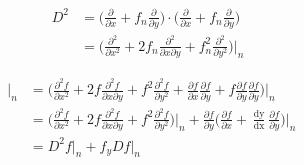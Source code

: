 \documentclass[12 pt]{article}
\begin{document}
	
	{
		\large
		\begin{equation}
			\begin{split}
				D^{2} &= \bigg(\frac{\partial }{\partial x} + f_{n}\frac{\partial }{\partial y}\bigg)\cdot \bigg(\frac{\partial }{\partial x} + f_{n}\frac{\partial }{\partial y}\bigg)\\
				&= \Big(\frac{\partial^{2}}{\partial x^{2}} + 2f_{n}\frac{\partial^{2}}{\partial x \partial y} + f_{n}^{2}\frac{\partial^{2}}{\partial y^{2}}\Big)\Big\vert_{n}
			\end{split}
		\end{equation}
	}
	
	{
		\large
		\begin{equation*}
			\begin{split}
				\frac{\mathop{\mathrm{d^{2}f}}}{\mathop{\mathrm{dx^{2}}}}\Big\vert_{n} &= \Big(\frac{\partial^{2}f}{\partial x^{2}} + 2f\frac{\partial^{2}f}{\partial x \partial y} + f^{2}\frac{\partial^{2}f}{\partial y^{2}} + \frac{\partial f}{\partial x}\frac{\partial f}{\partial y} + f\frac{\partial f}{\partial y}\frac{\partial f}{\partial y}\Big)\Big\vert_{n}\\
				&= \Big(\frac{\partial^{2}f}{\partial x^{2}} + 2f\frac{\partial^{2}f}{\partial x \partial y} + f^{2}\frac{\partial^{2}f}{\partial y^{2}}\Big)\Big\vert_{n} + \frac{\partial f}{\partial y}\bigg(\frac{\partial f}{\partial x} + \frac{\mathop{\mathrm{dy}}}{\mathop{\mathrm{dx}}}\frac{\partial f }{\partial y}\bigg)\Big\vert_{n}\\
				&=D^{2}f\Big\vert_{n}+f_{y}Df\Big\vert_{n}\\																   
			\end{split}
		\end{equation*}
		
	}
	
\end{document}
